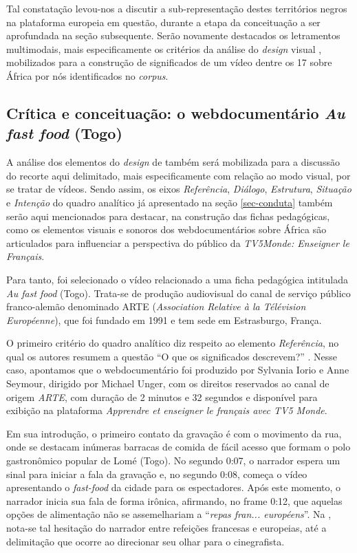 \documentclass[portuguese]{textolivre}
\begin{document}
Tal constatação levou-nos a discutir a sub-representação destes territórios negros na plataforma europeia em questão, durante a etapa da conceituação a ser aprofundada na seção subsequente. Serão novamente destacados os letramentos multimodais, mais especificamente os critérios da análise do \textit{design} visual \cite{kalantzis_letramentos_2020}, mobilizados para a construção de significados de um vídeo dentre os 17 sobre África por nós identificados no \textit{corpus}. 

\subsection{Crítica e conceituação: o webdocumentário \textit{Au fast food} (Togo)}\label{sec-organizacao}
A análise dos elementos do \textit{design} de \textcite{kalantzis_letramentos_2020} também será mobilizada para a discussão do recorte aqui delimitado, mais especificamente com relação ao modo visual, por se tratar de vídeos. Sendo assim, os eixos \emph{Referência}, \emph{Diálogo}, \emph{Estrutura}, \emph{Situação} e \emph{Intenção} do quadro analítico já apresentado na seção \ref{sec-conduta} também serão aqui mencionados para destacar, na construção das fichas pedagógicas, como os elementos visuais e sonoros dos webdocumentários sobre África são articulados para influenciar a perspectiva do público da \textit{TV5Monde: Enseigner le Français}. 

Para tanto, foi selecionado o vídeo relacionado a uma ficha pedagógica intitulada \textit{Au fast food} (Togo). Trata-se de produção audiovisual do canal de serviço público franco-alemão denominado  ARTE (\textit{Association Relative à la Télévision Européenne}),  que foi fundado em 1991 e tem sede em Estrasburgo, França. 

O primeiro critério do quadro analítico diz respeito ao elemento \emph{Referência}, no qual os autores resumem a questão “O que os significados descrevem?” \cite[p. 293]{kalantzis_letramentos_2020}. Nesse caso, apontamos que o webdocumentário foi produzido por Sylvania Iorio e Anne Seymour, dirigido por Michael Unger, com os direitos reservados ao canal de origem \textit{ARTE}, com duração de 2 minutos e 32 segundos e disponível para exibição na plataforma \textit{Apprendre et enseigner le français avec TV5 Monde}.

Em sua introdução, o primeiro contato da gravação é com o movimento da rua, onde se destacam inúmeras barracas de comida de fácil acesso que formam o polo gastronômico popular de Lomé (Togo). No segundo 0:07, o narrador espera um sinal para iniciar a fala da gravação e, no segundo 0:08, começa o vídeo apresentando o \textit{fast-food} da cidade para os espectadores. Após este momento, o narrador inicia sua fala de forma irônica, afirmando, no frame 0:12, que aquelas opções de alimentação não se assemelhariam a “\textit{repas fran... européens}”. Na , nota-se tal hesitação do narrador entre refeições francesas e europeias, até a delimitação que ocorre ao direcionar seu olhar para o cinegrafista.
\end{document}
